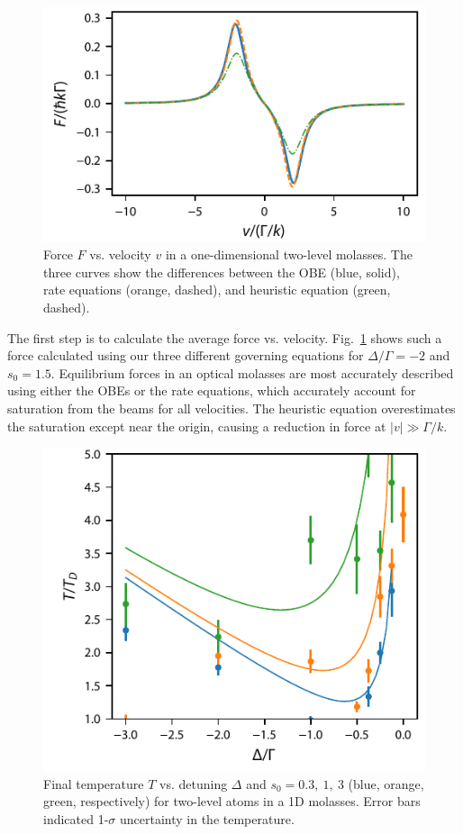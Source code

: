 \documentclass[final,5p,times,twocolumn]{elsarticle}
\begin{document}
\begin{figure}
	\center
	\includegraphics{figs/two_level_molasses_forces.pdf}
	\caption{\label{fig:two_level_molasses_forces} Force $F$ vs. velocity $v$ in a one-dimensional two-level molasses.  The three curves show the differences between the OBE (blue, solid), rate equations (orange, dashed), and heuristic equation (green, dashed).}
\end{figure}

The first step is to calculate the average force vs. velocity.  Fig.~\ref{fig:two_level_molasses_forces} shows such a force calculated using our three different governing equations for $\Delta/\Gamma=-2$ and $s_0=1.5$.  Equilibrium forces in an optical molasses are most accurately described using either the OBEs or the rate equations, which accurately account for saturation from the beams for all velocities.  The heuristic equation overestimates the saturation except near the origin, causing a reduction in force at $|v|\gg \Gamma/k$.  

\begin{figure}
	\center
	\includegraphics{figs/final_temperature_two_level_1D_molasses_rate_eqn.pdf}
	\caption{\label{fig:doppler_limit} Final temperature $T$ vs. detuning $\Delta$ and $s_0=0.3,\ 1,\ 3$ (blue, orange, green, respectively) for two-level atoms in a 1D molasses.  Error bars indicated 1-$\sigma$ uncertainty in the temperature.}
\end{figure}
\end{document}
